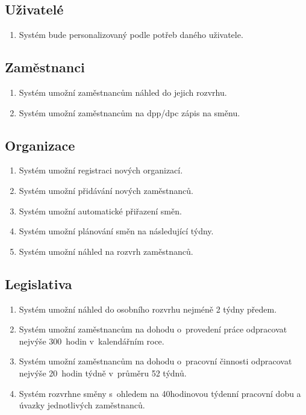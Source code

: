 \documentclass[twoside]{ctuthesis}
\begin{document}
\subsection{Uživatelé}
\begin{enumerate}[label=\textbf{U\arabic*.}]
		\item Systém bude personalizovaný podle potřeb daného uživatele.
\end{enumerate}

\subsection{Zaměstnanci}
\begin{enumerate}[label=\textbf{Z\arabic*.}]
		\item Systém umožní zaměstnancům náhled do jejich rozvrhu.
		\item Systém umožní zaměstnancům na \acrshort{dpp}/\acrshort{dpc} zápis na směnu.
\end{enumerate}

\subsection{Organizace}
\begin{enumerate}[label=\textbf{O\arabic*.}]
	\item Systém umožní registraci nových organizací.
	\item Systém umožní přidávání nových zaměstnanců.
	\item Systém umožní automatické přiřazení směn.
	\item Systém umožní plánování směn na následující týdny.
	\item Systém umožní náhled na rozvrh zaměstnanců.
\end{enumerate}

\subsection{Legislativa}
\begin{enumerate}[label=\textbf{L\arabic*.}]
		\item Systém umožní náhled do osobního rozvrhu nejméně 2 týdny předem.
		\item Systém umožní zaměstnancům na dohodu o~provedení práce odpracovat nejvýše 300~hodin v~kalendářním roce.
		\item Systém umožní zaměstnancům na dohodu o~pracovní činnosti odpracovat nejvýše 20~hodin týdně v~průměru 52 týdnů.
		\item Systém rozvrhne směny s~ohledem na 40hodinovou týdenní pracovní dobu a úvazky jednotlivých zaměstnanců.
\end{enumerate}
\end{document}
